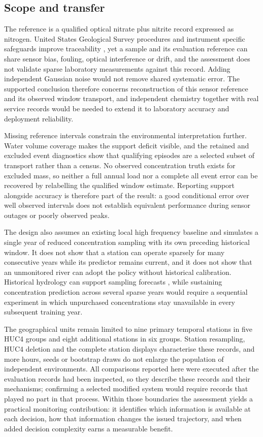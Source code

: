 \documentclass[lineno,pdflatex,sn-apa]{sn-jnl}%
\theoremstyle{thmstyleone}%
\theoremstyle{thmstyletwo}%
\theoremstyle{thmstylethree}%
\begin{document}
\subsection{Scope and transfer}

The reference is a qualified optical nitrate plus nitrite record expressed as nitrogen. United States Geological Survey procedures and instrument specific safeguards improve traceability \citep{wagner2006,pellerin2013}, yet a sample and its evaluation reference can share sensor bias, fouling, optical interference or drift, and the assessment does not validate sparse laboratory measurements against this record. Adding independent Gaussian noise would not remove shared systematic error. The supported conclusion therefore concerns reconstruction of this sensor reference and its observed window transport, and independent chemistry together with real service records would be needed to extend it to laboratory accuracy and deployment reliability.

Missing reference intervals constrain the environmental interpretation further. Water volume coverage makes the support deficit visible, and the retained and excluded event diagnostics show that qualifying episodes are a selected subset of transport rather than a census. No observed concentration truth exists for excluded mass, so neither a full annual load nor a complete all event error can be recovered by relabelling the qualified window estimate. Reporting support alongside accuracy is therefore part of the result: a good conditional error over well observed intervals does not establish equivalent performance during sensor outages or poorly observed peaks.

The design also assumes an existing local high frequency baseline and simulates a single year of reduced concentration sampling with its own preceding historical window. It does not show that a station can operate sparsely for many consecutive years while its predictor remains current, and it does not show that an unmonitored river can adopt the policy without historical calibration. Historical hydrology can support sampling forecasts \citep{wilson2026}, while sustaining concentration prediction across several sparse years would require a sequential experiment in which unpurchased concentrations stay unavailable in every subsequent training year.

The geographical units remain limited to nine primary temporal stations in five HUC4 groups and eight additional stations in six groups. Station resampling, HUC4 deletion and the complete station displays characterise these records, and more hours, seeds or bootstrap draws do not enlarge the population of independent environments. All comparisons reported here were executed after the evaluation records had been inspected, so they describe these records and their mechanisms; confirming a selected modified system would require records that played no part in that process. Within those boundaries the assessment yields a practical monitoring contribution: it identifies which information is available at each decision, how that information changes the issued trajectory, and when added decision complexity earns a measurable benefit.
\end{document}
